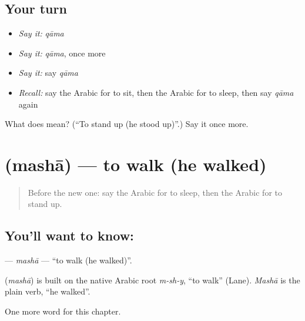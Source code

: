 \subsection*{Your turn}
\begin{itemize}
\raggedright
  \item \emph{Say it:} \emph{qāma}
  \item \emph{Say it:} \emph{qāma}, once more
  \item \emph{Say it:} say \emph{qāma}
  \item \emph{Recall:} say the Arabic for to sit, then the Arabic for to sleep, then say \emph{qāma} again
\end{itemize}

\begin{tcolorbox}[breakable,colback=teal!4,colframe=teal!35!black,title={Before you move on}]
What does  mean? (\textquotedblleft{}To stand up (he stood up)\textquotedblright{}.) Say it once more.
\end{tcolorbox}
\section[\texorpdfstring{\ar{مشى} (mashā)}{مشى (mashā)}]{ (mashā) — to walk (he walked)}

\label{lesson:AR-C58-masha}



\begin{quote}
Before the new one: say the Arabic for to sleep, then the Arabic for to stand up.
\end{quote}

\subsection*{You'll want to know: }
\textbf{} — \emph{mashā} — \textquotedblleft{}to walk (he walked)\textquotedblright{}.

\begin{cousinweb}
\textbf{} (\emph{mashā}) is built on the native Arabic root \emph{m-sh-y}, \textquotedblleft{}to walk\textquotedblright{} (Lane). \emph{Mashā} is the plain verb, \textquotedblleft{}he walked\textquotedblright{}.
\end{cousinweb}

\begin{grammarlens}[title={What you've built}]
One more word for this chapter.
\end{grammarlens}

